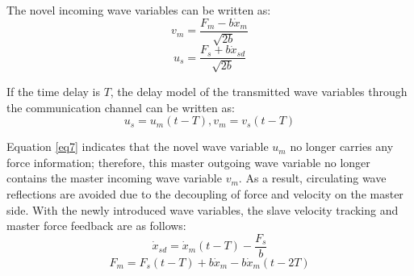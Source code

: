 \par The novel incoming wave variables can be written as:
\begin{equation}
    {{v}_{m}}=\frac{{{F}_{m}}-b{{{\dot{x}}}_{m}}}{\sqrt{2b}}\label{eq9}
\end{equation}
\begin{equation}
    {{u}_{s}}=\frac{{{F}_{s}}+b{{{\dot{x}}}_{sd}}}{\sqrt{2b}}\label{eq10}
\end{equation}
\par If the time delay is $T$, the delay model
of the transmitted wave variables through the communication channel can be written as:
\begin{equation}
    {u_s}={{u}_{m}}(t-T),{{v}_{m}}={{v}_{s}}(t-T) \label{eq11}
\end{equation}


\par Equation \eqref{eq7} indicates that the novel wave variable $u_m$ no longer carries any force information;
therefore, this master outgoing wave variable no longer contains the master incoming wave variable $v_m$.
As a result, circulating wave reflections are avoided due to the decoupling of force
and velocity on the master side.
With the newly introduced wave variables,
the slave velocity tracking and master force feedback are as follows:
\begin{equation}
    {{{\dot{x}}}_{sd}}={{{\dot{x}}}_{m}}(t-T)-\frac{{{F}_{s}}}{b}  \label{eq12}
\end{equation}
\begin{equation}
    {{F}_{m}}={{F}_{s}}(t-T)+b{{{\dot{x}}}_{m}}-b{{{\dot{x}}}_{m}}(t-2T) \label{eq13}
\end{equation}


